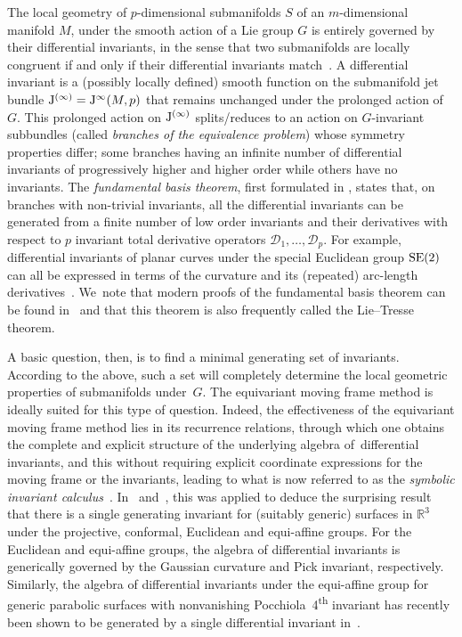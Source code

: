 \documentclass[pdftex]{sigma}%
\numberwithin{equation}{section}
\newcommand{\R}{\mathbb{R}}
\newcommand{\D}{\mathcal{D}}
\newcommand{\J}{{\rm J}}
\begin{document}
The local geometry of $p$-dimensional submanifolds $S$ of an $m$-dimensional manifold $M$, under the smooth action of a Lie group $G$ is entirely governed by their differential invariants, in the sense that two submanifolds are locally congruent if and only if their differential invariants match~\cite{FO-1999,G-74}. A differential invariant is a (possibly locally defined) smooth function on the submanifold jet bundle $\J^{(\infty)}=\J^\infty(M,p)$ that remains unchanged under the prolonged action of~$G$. This prolonged action on $\J^{(\infty)}$ splits/reduces to an action on $G$-invariant subbundles (called \emph{branches of the equivalence problem}) whose symmetry properties differ; some branches having an infinite number of differential invariants of progressively higher and higher order while others have no invariants. The \emph{fundamental basis theorem}, first formulated in \cite[p.~760]{L-1893}, states that, on branches with non-trivial invariants, all the differential invariants can be generated from a finite number of low order invariants and their derivatives with respect to $p$ invariant total derivative operators $\D_1,\dots, \D_p$. For example, differential invariants of planar curves under the special Euclidean group ${\rm SE}(2)$ can all be expressed in terms of the curvature and its (repeated) arc-length derivatives~\cite{O-2001}. We~note that modern proofs of the fundamental basis theorem can be found in~\cite{KL-2006,KL-2016,OP-2007} and that this theorem is also frequently called the Lie--Tresse theorem.

A basic question, then, is to find a minimal generating set of invariants. According to the above, such a set will completely determine the local geometric properties of submanifolds under~$G$. The equivariant moving frame method is ideally suited for this type of question. Indeed, the effectiveness of the equivariant moving frame method lies in its recurrence relations, through which one obtains the complete and explicit structure of the underlying algebra of~differential invariants, and this without requiring explicit coordinate expressions for the moving frame or the invariants, leading to what is now referred to as the \emph{symbolic invariant calculus}~\cite{M-2010}. In~\cite{HO-2007} and~\cite{O-2009diff}, this was applied to deduce the surprising result that there is a single generating invariant for (suitably generic) surfaces in $\R^3$ under the projective, conformal, Euclidean and equi-affine groups. For the Euclidean and equi-affine groups, the algebra of differential invariants is generically governed by the Gaussian curvature and Pick invariant, respectively. Similarly, the algebra of differential invariants under the equi-affine group for generic parabolic surfaces with nonvanishing Pocchiola~4\textsuperscript{th} invariant has recently been shown to be generated by a single differential invariant in~\cite{CM-2020}.
\end{document}

